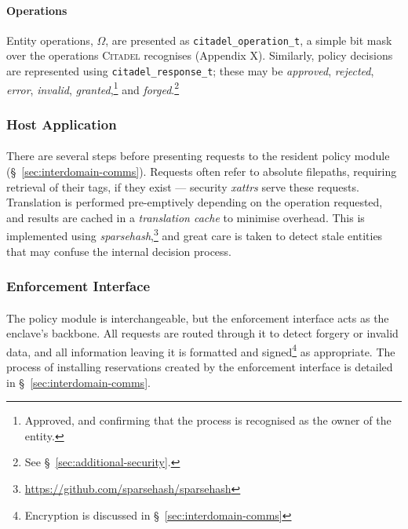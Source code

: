 \paragraph{Operations} Entity operations, $\Omega$, are presented as \texttt{citadel\_operation\_t}, a simple bit mask over the operations \textsc{Citadel} recognises (Appendix X). Similarly, policy decisions are represented using \texttt{citadel\_response\_t}; these may be \textit{approved}, \textit{rejected}, \textit{error}, \textit{invalid}, \textit{granted},\footnote{Approved, and confirming that the process is recognised as the owner of the entity.} and \textit{forged}.\footnote{See §~\ref{sec:additional-security}.}


\subsubsection{Host Application}

\paragraph{} There are several steps before presenting requests to the resident policy module (§~\ref{sec:interdomain-comms}). Requests often refer to absolute filepaths, requiring retrieval of their tags, if they exist --- security \textit{xattrs} serve these requests. Translation is performed pre-emptively depending on the operation requested, and results are cached in a \textit{translation cache} to minimise overhead. This is implemented using \textit{sparsehash},\footnote{\url{https://github.com/sparsehash/sparsehash}} and great care is taken to detect stale entities that may confuse the internal decision process.


\subsubsection{Enforcement Interface}
\paragraph{} The policy module is interchangeable, but the enforcement interface acts as the enclave's backbone. All requests are routed through it to detect forgery or invalid data, and all information leaving it is formatted and signed\footnote{Encryption is discussed in §~\ref{sec:interdomain-comms}} as appropriate. The process of installing reservations created by the enforcement interface is detailed in §~\ref{sec:interdomain-comms}.

